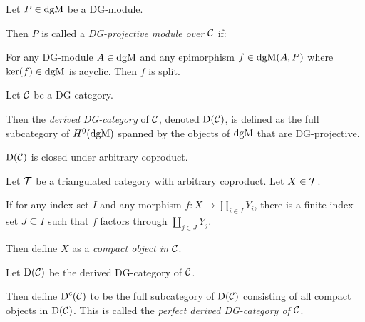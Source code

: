\begin{definition}
    Let \( P \in \operatorname{dgM} \) be a DG-module.

    Then \( P \) is called a \emph{DG-projective module over \( {\mathcal{C}} \)} if:
    
    For any DG-module \( A \in \operatorname{dgM} \) and any epimorphism \( f \in \operatorname{dgM}(A, P) \) where \( \ker(f) \in \operatorname{dgM} \) is acyclic. Then \( f \) is split.
\end{definition}

\begin{definition}
    Let \( {\mathcal{C}} \) be a DG-category.

    Then the \emph{derived DG-category} of \( {\mathcal{C}} \), denoted \( \operatorname{D}({\mathcal{C}}) \), is defined as the full subcategory of \( H^0(\operatorname{dgM}) \) spanned by the objects of \( \operatorname{dgM} \) that are DG-projective.
\end{definition}

\begin{proposition}
    \( \operatorname{D}({\mathcal{C}}) \) is closed under arbitrary coproduct.
\end{proposition}

\begin{definition}
    Let \( {\mathcal{T}} \) be a triangulated category with arbitrary coproduct. Let \( X \in {\mathcal{T}} \).
    
    If for any index set \( I \) and any morphism \( f: X \to \coprod_{i \in I} Y_i \), there is a finite index set \( J \subseteq I \) such that \( f \) factors through \( \coprod_{j \in J} Y_j \).
    
    Then define \( X \) as a \emph{compact object in \( {\mathcal{C}} \)}.
\end{definition}

\begin{definition}
    Let \( \operatorname{D}({\mathcal{C}}) \) be the derived DG-category of \( {\mathcal{C}} \).

    Then define \( \operatorname{D}^c({\mathcal{C}}) \) to be the full subcategory of \( \operatorname{D}({\mathcal{C}}) \) consisting of all compact objects in \( \operatorname{D}({\mathcal{C}}) \). This is called the \emph{perfect derived DG-category of \( {\mathcal{C}} \)}.
\end{definition}

